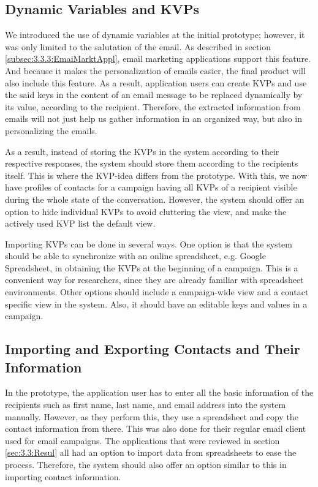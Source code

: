 \subsection{Dynamic Variables and \ac{KVP}s}
\label{subsec:5.1.2:DynmVariKVPs}
We introduced the use of dynamic variables at the initial prototype; however, it was only limited to the salutation of the email. As described in section \ref{subsec:3.3.3:EmaiMarktAppl}, email marketing applications support this feature. And because it makes the personalization of emails easier, the final product will also include this feature. As a result, application users can create \ac{KVP}s and use the said keys in the content of an email message to be replaced dynamically by its value, according to the recipient. Therefore, the extracted information from emails will not just help us gather information in an organized way, but also in personalizing the emails.
\vspace{1cm}

As a result, instead of storing the \ac{KVP}s in the system according to their respective responses, the system should store them according to the recipients itself. This is where the \ac{KVP}-idea differs from the prototype. With this, we now have profiles of contacts for a campaign having all \ac{KVP}s of a recipient visible during the whole state of the conversation. However, the system should offer an option to hide individual \ac{KVP}s to avoid cluttering the view, and make the actively used \ac{KVP} list the default view.

\vspace{1cm}
Importing \ac{KVP}s can be done in several ways. One option is that the system should be able to synchronize with an online spreadsheet, e.g. Google Spreadsheet, in obtaining the \ac{KVP}s at the beginning of a campaign. This is a convenient way for researchers, since they are already familiar with spreadsheet environments. Other options should include a campaign-wide view and a contact specific view in the system. Also, it should have an editable keys and values in a campaign.

\subsection{Importing and Exporting Contacts and Their Information}
\label{subsec:5.1.3:ImpoExpoContInfo}
In the prototype, the application user has to enter all the basic information of the recipients such as first name, last name, and email address into the system manually. However, as they perform this, they use a spreadsheet and copy the contact information from there. This was also done for their regular email client used for email campaigns. The applications that were reviewed in section \ref{sec:3.3:Resul} all had an option to import data from spreadsheets to ease the process. Therefore, the system should also offer an option similar to this in importing contact information.
\vspace{1cm}

